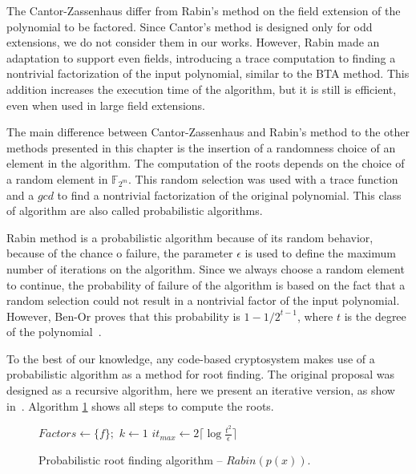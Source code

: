 The Cantor-Zassenhaus differ from Rabin's method on the field extension of the polynomial to be factored. Since Cantor's method is designed only for odd extensions, we do not consider them in our works. However, Rabin made an adaptation to support even fields, introducing a trace computation to finding a nontrivial factorization of the input polynomial, similar to the BTA method. This addition increases the execution time of the algorithm, but it is still is efficient, even when used in large field extensions. 

The main difference between Cantor-Zassenhaus and Rabin's method to the other methods presented in this chapter is the insertion of a randomness choice of an element in the algorithm. The computation of the roots depends on the choice of a random element in $\mathbb{F}_{2^{m}}$. This random selection was used with a trace function and a $gcd$ to find a nontrivial factorization of the original polynomial. This class of algorithm are also called probabilistic algorithms.

Rabin method is a probabilistic algorithm because of its random behavior, because of the chance o failure, the parameter $\epsilon$ is used to define the maximum number of iterations on the algorithm. Since we always choose a random element to continue, the probability of failure of the algorithm is based on the fact that a random selection could not result in a nontrivial factor of the input polynomial. However, Ben-Or proves that this probability is $1 - 1/2^{t-1}$, where $t$ is the degree of the polynomial~\cite{ben1981probabilistic}.

To the best of our knowledge, any code-based cryptosystem makes use of a probabilistic algorithm as a method for root finding. The original proposal was designed as a recursive algorithm, here we present an iterative version, as show in~\cite{von2001factoring}. Algorithm \ref{alg:new} shows all steps to compute the roots. 


\begin{figure}[ht]
\begin{algorithm}[H]
    $Factors \gets \{f\};$ 
    $k \gets 1$\;
    $it_{max} \gets 2 \lceil\log{\frac{t^2}{\epsilon}}\rceil$\;
 \caption{Probabilistic root finding algorithm -- $Rabin(p(x))$.}
  \label{alg:new}
\end{algorithm}
\end{figure}

